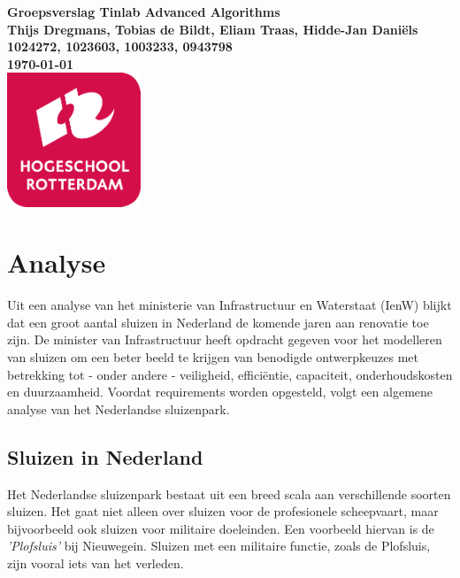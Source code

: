 \documentclass{article} %
\begin{document}
\sffamily
\begin{titlepage}
    \centering
    \vfill
    {\bfseries\Huge
    Groepsverslag Tinlab Advanced Algorithms \\
    \vskip2cm
    }
    {\bfseries\Large
    Thijs Dregmans, Tobias de Bildt, Eliam Traas, Hidde-Jan Daniëls\\
    }
    {
    \bfseries\normalsize
    1024272, 1023603, 1003233, 0943798\\
    \vskip1cm
    \today\\
    }    
    \vfill
    \includegraphics[width=4cm]{logohr.png} %
    \vfill
    \vfill
\end{titlepage}
\newpage

\tableofcontents
\newpage

\section{Analyse}
Uit een analyse van het ministerie van Infrastructuur en Waterstaat (IenW) blijkt dat een groot aantal sluizen in Nederland de komende jaren aan renovatie toe zijn. De minister van Infrastructuur heeft opdracht gegeven voor het modelleren van sluizen om een beter beeld te krijgen van benodigde ontwerpkeuzes met betrekking tot - onder andere - veiligheid, efficiëntie, capaciteit, onderhoudskosten en duurzaamheid. Voordat requirements worden opgesteld, volgt een algemene analyse van het Nederlandse sluizenpark. \par

\subsection{Sluizen in Nederland}
Het Nederlandse sluizenpark bestaat uit een breed scala aan verschillende soorten sluizen. Het gaat niet alleen over sluizen voor de profesionele scheepvaart, maar bijvoorbeeld ook sluizen voor militaire doeleinden. Een voorbeeld hiervan is de \textit{'Plofsluis'} bij Nieuwegein. \cite{rijkswaterstaatPlofsluis} Sluizen met een militaire functie, zoals de Plofsluis, zijn vooral iets van het verleden. \par
\end{document}
